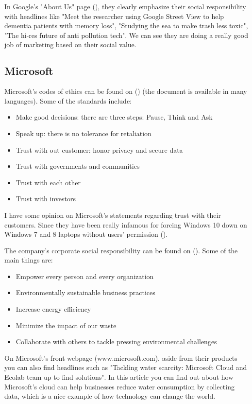 \documentclass[12pt]{article}
\begin{document}
In Google's "About Us" page (\cite{goa17}), they clearly emphasize their social responsibility with headlines like "Meet the researcher using Google Street View to help dementia patients with memory loss", "Studying the sea to make trash less toxic", "The hi-res future of anti pollution tech". We can see they are doing a really good job of marketing based on their social value.

\subsection{Microsoft}

Microsoft's codes of ethics can be found on (\cite{mssbc}) (the document is available in many languages). Some of the standards include:

\begin{itemize} 
	\item{Make good decisions: there are three steps: Pause, Think and Ask}
	\item{Speak up: there is no tolerance for retaliation}
	\item{Trust with out customer: honor privacy and secure data}
	\item{Trust with governments and communities}
	\item{Trust with each other}
	\item{Trust with investors}
\end{itemize}

I have some opinion on Microsoft's statements regarding trust with their customers. Since they have been really infamous for forcing Windows 10 down on Windows 7 and 8 laptops without users' permission (\cite{kle16}).

The company's corporate social responsibility can be found on (\cite{mscsr}). Some of the main things are:

\begin{itemize}
	\item{Empower every person and every organization}
	\item{Environmentally sustainable business practices}
	\item{Increase energy efficiency}
	\item{Minimize the impact of our waste}
	\item{Collaborate with others to tackle pressing environmental challenges}
\end{itemize}

On Microsoft's front webpage (www.microsoft.com), aside from their products you can also find headlines such as "Tackling water scarcity: Microsoft Cloud and Ecolab team up to find solutions". In this article you can find out about how Microsoft's cloud can help businesses reduce water consumption by collecting data, which is a nice example of how technology can change the world.
\end{document}
